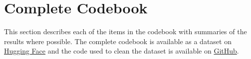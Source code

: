 \clearpage
\section{Complete Codebook}
\label{app:codebook}

This section describes each of the items in the codebook with summaries of the results where possible. The complete codebook is available as a dataset on \href{https://huggingface.co/datasets/ambean/construct-validity-review}{Hugging Face} and the code used to clean the dataset is available on \href{https://github.com/am-bean/benchmark_review}{GitHub}.

